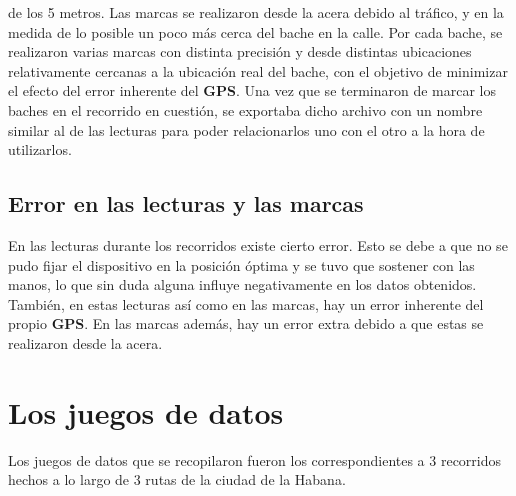 		de los 5 metros. Las marcas se realizaron desde la acera debido al tráfico, y en la medida de lo posible un poco más cerca del bache en la calle.
		Por cada bache, se realizaron varias marcas con distinta precisión y desde distintas ubicaciones relativamente cercanas a la ubicación real del
		bache, con el objetivo de minimizar el efecto del error inherente del \textbf{GPS}. Una vez que se terminaron de marcar los baches en el recorrido
		en cuestión, se exportaba dicho archivo con un nombre similar al de las lecturas para poder relacionarlos uno con el otro a la hora de utilizarlos.

	\subsection{Error en las lecturas y las marcas}
		En las lecturas durante los recorridos existe cierto error. Esto se debe a que no se pudo fijar el dispositivo en la posición óptima y se tuvo que
		sostener con las manos, lo que sin duda alguna influye negativamente en los datos obtenidos. También, en estas lecturas así como en las marcas, hay un
		error inherente del propio \textbf{GPS}. En las marcas además, hay un error extra debido a que estas se realizaron desde la acera.

\section{Los juegos de datos}   
	Los juegos de datos que se recopilaron fueron los correspondientes a 3 recorridos hechos a lo largo de 3 rutas de la ciudad de la Habana.

